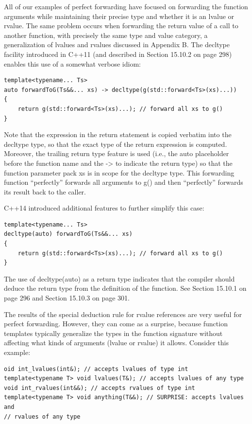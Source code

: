 All of our examples of perfect forwarding have focused on forwarding the function arguments while maintaining their precise type and whether it is an lvalue or rvalue. The same problem occurs when forwarding the return value of a call to another function, with precisely the same type and value category, a generalization of lvalues and rvalues discussed in Appendix B. The decltype facility introduced in C++11 (and described in Section 15.10.2 on page 298) enables this use of a somewhat verbose idiom:

\begin{lstlisting}[style=styleCXX]
template<typename... Ts>
auto forwardToG(Ts&&... xs) -> decltype(g(std::forward<Ts>(xs)...))
{
	return g(std::forward<Ts>(xs)...); // forward all xs to g()
}
\end{lstlisting}

Note that the expression in the return statement is copied verbatim into the decltype type, so that the exact type of the return expression is computed. Moreover, the trailing return type feature is used (i.e., the auto placeholder before the function name and the -> to indicate the return type) so that the function parameter pack xs is in scope for the decltype type. This forwarding function “perfectly” forwards all arguments to g() and then “perfectly” forwards its result back to the caller.

C++14 introduced additional features to further simplify this case:

\begin{lstlisting}[style=styleCXX]
template<typename... Ts>
decltype(auto) forwardToG(Ts&&... xs)
{
	return g(std::forward<Ts>(xs)...); // forward all xs to g()
}
\end{lstlisting}

The use of decltype(auto) as a return type indicates that the compiler should deduce the return type from the definition of the function. See Section 15.10.1 on page 296 and Section 15.10.3 on page 301.


The results of the special deduction rule for rvalue references are very useful for perfect forwarding. However, they can come as a surprise, because function templates typically generalize the types in the function signature without affecting what kinds of arguments (lvalue or rvalue) it allows. Consider this example:

\begin{lstlisting}[style=styleCXX]
oid int_lvalues(int&); // accepts lvalues of type int
template<typename T> void lvalues(T&); // accepts lvalues of any type
void int_rvalues(int&&); // accepts rvalues of type int
template<typename T> void anything(T&&); // SURPRISE: accepts lvalues and
// rvalues of any type
\end{lstlisting}

